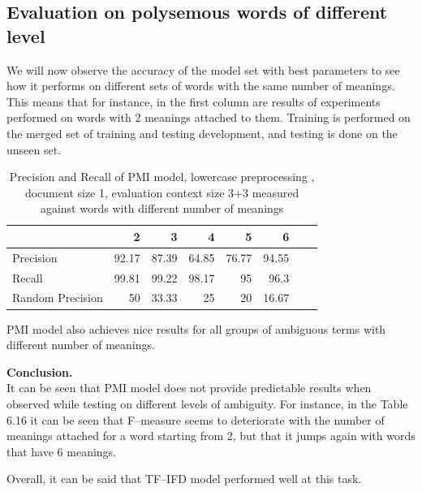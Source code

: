 \subsection{ Evaluation on polysemous words of different level}
We will now observe the accuracy of the model set with best
parameters to see how it performs on different sets of words with the same number of meanings. This means
that for instance, in the first column are results of experiments performed on words with 2 meanings attached to them.
Training is performed on the merged set of training and testing development, and testing is done on the unseen set.
\begin{table}[h!]
\begin{tabular}{ l | r r r r r r r  }
     & 2 & 3 & 4 & 5 & 6  \\
 \hline
Precision  & 92.17 & 87.39 & 64.85 & 76.77 & 94.55\\ 
Recall & 99.81 & 99.22 & 98.17 & 95 & 96.3\\ 
Random Precision & 50 & 33.33 & 25 & 20 & 16.67 \\
\end{tabular}
\caption{Precision and Recall of PMI model, lowercase preprocessing , document size 1, evaluation context size 3+3 measured against words with different number of meanings}
\end{table} 

PMI model also achieves nice results for all groups of ambiguous terms with different number of meanings. 

\textbf{Conclusion.}\\
It can be seen that PMI model does not provide predictable results when observed while testing on different levels
of ambiguity. For instance, in the Table 6.16 it can be seen that F--measure seems to deteriorate with the number of meanings 
attached for a word starting from 2, but that it jumps again with words that have 6 meanings. 

Overall, it can be said that TF--IFD model performed well at this task. 



